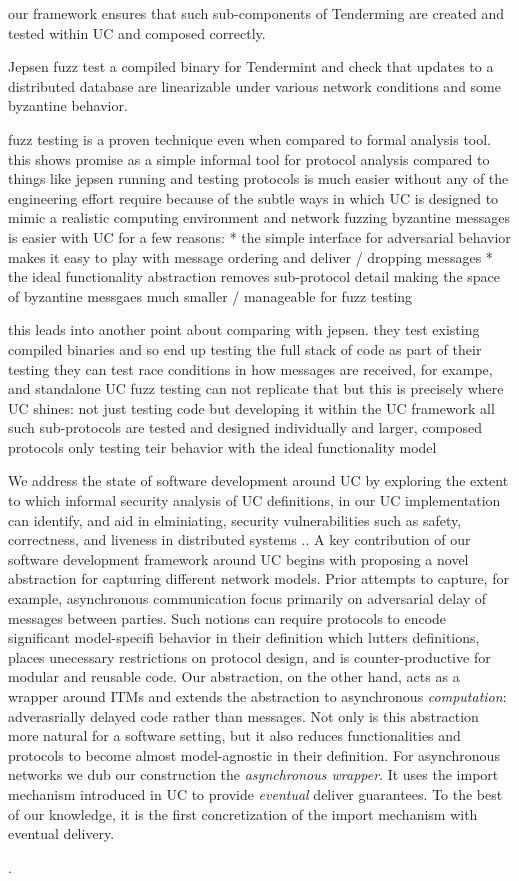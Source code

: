 our framework ensures that such sub-components of Tenderming are created and tested
within UC and composed correctly. 

Jepsen fuzz test a compiled binary for Tendermint and check that updates to a distributed database are linearizable under various network conditions and some byzantine behavior.



fuzz testing is a proven technique even when compared to formal analysis tool. this shows promise as a simple informal tool for protocol analysis
compared to things like jepsen running and testing protocols is much easier without any of the engineering effort require because of the subtle ways in which UC is designed to mimic a realistic computing environment and network
fuzzing byzantine messages is easier with UC for a few reasons:
* the simple interface for adversarial behavior makes it easy to play with message ordering and deliver / dropping messages
* the ideal functionality abstraction removes sub-protocol detail making the space of byzantine messgaes much smaller / manageable for fuzz testing

this leads into another point about comparing with jepsen. they test existing compiled binaries and so end up testing the full stack of code as part of their testing
they can test race conditions in how messages are received, for exampe, and standalone UC fuzz testing can not replicate that
but this is precisely where UC shines: not just testing code but developing it within the UC framework all such sub-protocols are tested and designed individually and larger, composed protocols only testing teir behavior with the ideal functionality model 



We address the state of software development around UC by exploring the extent to which informal security analysis of UC definitions, in our UC implementation can identify, and aid in elminiating, security vulnerabilities such as safety, correctness, and liveness in distributed systems ..  
A key contribution of our software development framework around UC begins with proposing a novel abstraction for capturing different network models.
Prior attempts to capture, for example, asynchronous communication focus primarily on adversarial delay of messages between parties. 
Such notions can require protocols to encode significant model-specifi behavior in their definition which lutters definitions, places unecessary restrictions on protocol design, and is counter-productive for modular and reusable code. 
Our abstraction, on the other hand, acts as a wrapper around ITMs and extends the abstraction to asynchronous \emph{computation}: adverasrially delayed code rather than messages.  
Not only is this abstraction more natural for a software setting, but it also reduces functionalities and protocols to become almost model-agnostic in their definition. 
For asynchronous networks we dub our construction the \emph{asynchronous wrapper}. 
It uses the import mechanism introduced in UC to provide \emph{eventual} deliver guarantees.
To the best of our knowledge, it is the first concretization of the import mechanism with eventual delivery. 



.
